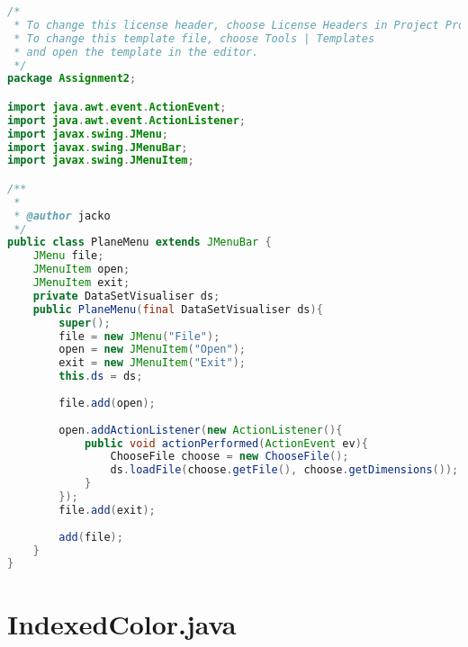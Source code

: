 \documentclass[pdftex,a4paper,10pt,titlepage]{article}
\begin{document}
\begin{lstlisting}[language=java, breaklines=true]
/*
 * To change this license header, choose License Headers in Project Properties.
 * To change this template file, choose Tools | Templates
 * and open the template in the editor.
 */
package Assignment2;

import java.awt.event.ActionEvent;
import java.awt.event.ActionListener;
import javax.swing.JMenu;
import javax.swing.JMenuBar;
import javax.swing.JMenuItem;

/**
 *
 * @author jacko
 */
public class PlaneMenu extends JMenuBar {
    JMenu file;
    JMenuItem open;
    JMenuItem exit;
    private DataSetVisualiser ds;
    public PlaneMenu(final DataSetVisualiser ds){
        super();
        file = new JMenu("File");
        open = new JMenuItem("Open");
        exit = new JMenuItem("Exit");
        this.ds = ds;
        
        file.add(open);
        
        open.addActionListener(new ActionListener(){
            public void actionPerformed(ActionEvent ev){
                ChooseFile choose = new ChooseFile();
                ds.loadFile(choose.getFile(), choose.getDimensions());
            }
        });
        file.add(exit);
        
        add(file);
    }
}

\end{lstlisting}



\section{IndexedColor.java}
\end{document}
